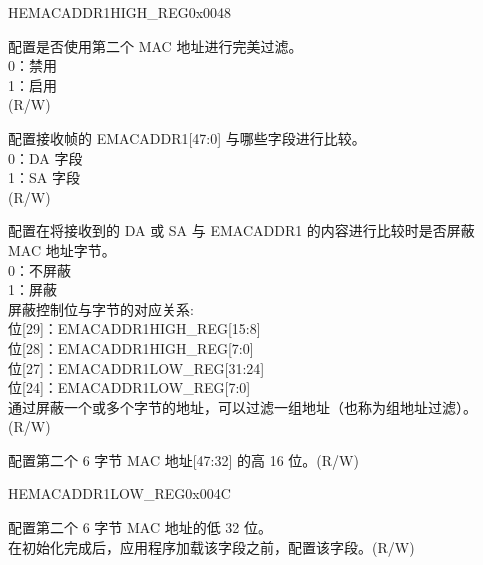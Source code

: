 \begin{register}{H}{EMACADDR1HIGH\_REG}{0x0048}\label{regdesc:EMACADDR1HIGHREG}
%
%
%
%
%
\regnewline%
\begin{regdesc}\begin{reglist}
\item [ADDRESS\_ENABLE1] 配置是否使用第二个 MAC 地址进行完美过滤。\\
0：禁用\\
1：启用\\ (R/W)
\item [SOURCE\_ADDRESS] 配置接收帧的 EMACADDR1[47:0] 与哪些字段进行比较。\\
0：DA 字段\\
1：SA 字段\\ (R/W)
\item [MASK\_BYTE\_CONTROL] 配置在将接收到的 DA 或 SA 与 EMACADDR1 的内容进行比较时是否屏蔽 MAC 地址字节。\\
0：不屏蔽\\
1：屏蔽\\
屏蔽控制位与字节的对应关系:\\
位[29]：EMACADDR1HIGH\_REG[15:8]\\
位[28]：EMACADDR1HIGH\_REG[7:0]\\
位[27]：EMACADDR1LOW\_REG[31:24]\\
位[24]：EMACADDR1LOW\_REG[7:0]\\
通过屏蔽一个或多个字节的地址，可以过滤一组地址（也称为组地址过滤）。(R/W)
\item [MAC\_ADDRESS1\_HI] 配置第二个 6 字节 MAC 地址[47:32] 的高 16 位。(R/W)
\end{reglist}\end{regdesc}
\end{register}


\begin{register}{H}{EMACADDR1LOW\_REG}{0x004C}\label{regdesc:EMACADDR1LOWREG}
%
\regnewline%
\begin{regdesc}\begin{reglist}
\item [EMACADDR1LOW\_REG] 配置第二个 6 字节 MAC 地址的低 32 位。\\在初始化完成后，应用程序加载该字段之前，配置该字段。(R/W)
\end{reglist}\end{regdesc}
\end{register}


